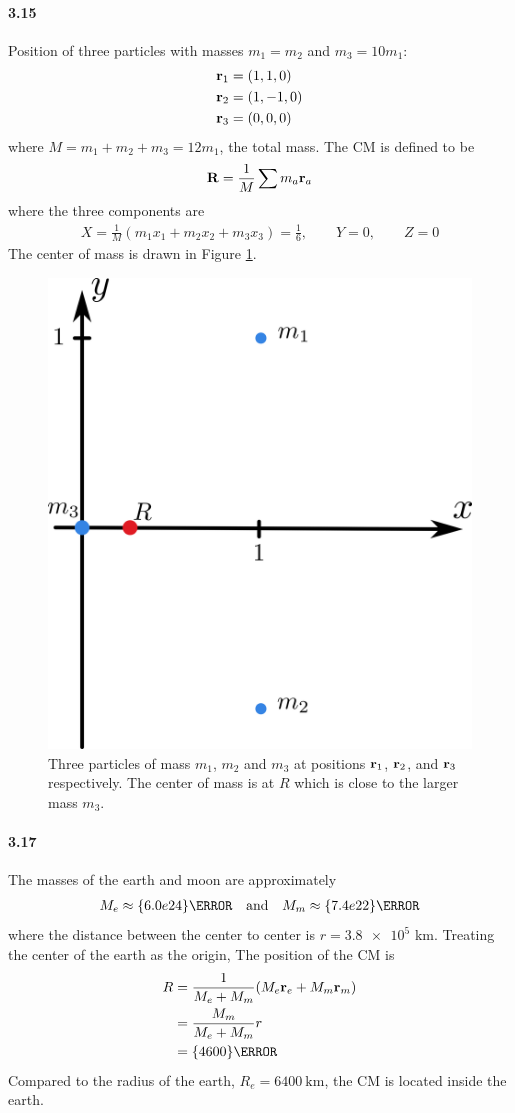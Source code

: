 \documentclass[../problems.tex]{subfiles}
\begin{document}
\paragraph{3.15}
Position of three particles with masses $m_1 = m_2$ and $m_3 = 10 m_1$:
\begin{align*}
    \vb{r}_1 &= (1,1,0) \\
    \vb{r}_2 &= (1,-1,0) \\
    \vb{r}_3 &= (0,0,0)
\end{align*}
where $M = m_1 + m_2 + m_3 = 12 m_1$, the total mass. The CM is defined to be 
\begin{align*}
    \vb{R} = \frac{1}{M} \sum m_a \vb{r}_a
\end{align*}
where the three components are
\begin{align*}
    X = \frac{1}{M} (m_1 x_1 + m_2 x_2 + m_3 x_3) = \frac{1}{6}, \qquad Y = 0,  \qquad Z = 0
\end{align*}
The center of mass is drawn in Figure \ref{fig:3_15}.
\begin{figure}[ht]
    \centering
    \includegraphics[width=0.3\linewidth]{../images/fig3_15.png}
    \captionsetup{width=0.7\linewidth}
    \caption{Three particles of mass $m_1$, $m_2$ and $m_3$ at positions $\vb{r}_1$,
    $\vb{r}_2$, and $\vb{r}_3$ respectively. The center of mass is at $R$ which is close to the 
    larger mass $m_3$.}
    \label{fig:3_15}
\end{figure}

\paragraph{3.17}
The masses of the earth and moon are approximately
\begin{align*}
    M_e \approx \qty{6.0e24}{\kg} \qand M_m \approx \qty{7.4e22}{\kg}
\end{align*}
where the distance between the center to center is $r = \num{3.8e5}$ km. Treating the center of the
earth as the origin, The position of the CM is
\begin{align*}
    R &= \frac{1}{M_e + M_m} (M_e \vb{r}_e + M_m \vb{r}_m) \\
    &= \frac{M_m}{M_e + M_m} r \\
    &= \qty{4600}{\km}
\end{align*}
Compared to the radius of the earth, $R_e = \qty{6400}{\km}$, the CM is located inside the earth.
\end{document}

